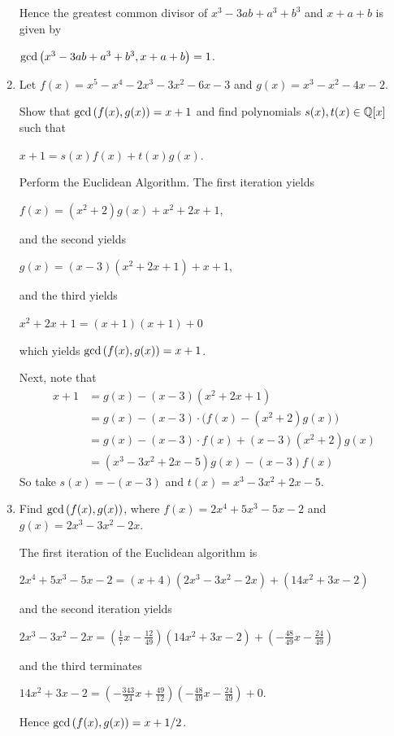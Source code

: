 \documentclass[11pt,fleqn,dvipsnames,usenames]{article}
\begin{document}
\begin{enumerate}
Hence the greatest common divisor of $x^3 - 3ab + a^3 + b^3$ and $x + a + b$ is given by
\begin{center}
$\text{gcd}\left(x^3 - 3ab + a^3 + b^3, x + a + b\right) = 1$.
\end{center}

\item Let $f(x) = x^5 - x^4 - 2x^3 - 3x^2 - 6x - 3$ and $g(x) = x^3 - x^2 - 4x - 2$.
\vsmsp

Show that $\text{gcd}\left(f(x),g(x)\right) = x+1$ and find polynomials $s(x),t(x)\in \mathbb{Q}[x]$ such that
\begin{center}
$x + 1 = s(x)f(x) + t(x)g(x)$.
\end{center}
\vsmsp

\solution Perform the Euclidean Algorithm.  The first iteration yields
\begin{center}
$f(x) = (x^2 + 2)g(x) + x^2 + 2x + 1$,
\end{center}
and the second yields
\begin{center}
$g(x) = (x-3)(x^2 + 2x + 1) + x + 1$,
\end{center}
and the third yields
\begin{center}
$x^2 + 2x + 1 = (x+1)(x+1) + 0$
\end{center}
which yields $\text{gcd}\left(f(x),g(x)\right) = x + 1$.

Next, note that
\begin{align*}
x + 1 &= g(x) - (x-3)(x^2 + 2x + 1)\\
&= g(x) - (x-3)\cdot \big(f(x) - (x^2 + 2)g(x)\big)\\
&= g(x) - (x-3)\cdot f(x) + (x-3)(x^2+2)g(x)\\
&= (x^3 - 3x^2 + 2x - 5)g(x) - (x-3)f(x)
\end{align*}
So take $s(x) = -(x - 3)$ and $t(x) = x^3 - 3x^2 + 2x - 5$.

\item Find $\text{gcd}\left(f(x),g(x)\right)$, where $f(x) = 2x^4 + 5x^3 - 5x - 2$ and $g(x) = 2x^3 - 3x^2 - 2x$.
\vsmsp

\solution The first iteration of the Euclidean algorithm is
\begin{center}
$2x^4 + 5x^3 - 5x - 2 = (x+4)(2x^3 - 3x^2 - 2x) + (14x^2 + 3x - 2)$
\end{center}
and the second iteration yields
\begin{center}
$2x^3 - 3x^2 - 2x = \left(\frac{1}{7}x - \frac{12}{49}\right)(14x^2 + 3x - 2) + \left(-\frac{48}{49}x - \frac{24}{49}\right)$
\end{center}
and the third terminates
\begin{center}
$14x^2 + 3x - 2 = \left(-\frac{343}{24}x + \frac{49}{12}\right)\left(-\frac{48}{49}x - \frac{24}{49}\right) + 0$.
\end{center}
Hence $\text{gcd}\left(f(x),g(x)\right) = x + 1/2$.


\end{enumerate}
\end{document}

